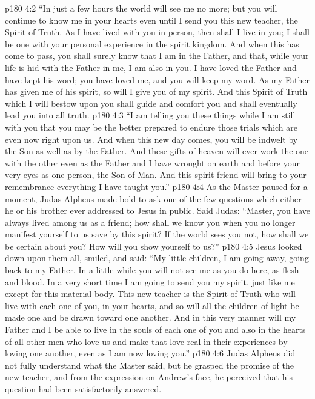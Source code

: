 \vs p180 4:2 \textcolor{ubdarkred}{“In just a few hours the world will see me no more; but you will continue to know me in your hearts even until I send you this new teacher, the Spirit of Truth. As I have lived with you in person, then shall I live in you; I shall be one with your personal experience in the spirit kingdom. And when this has come to pass, you shall surely know that I am in the Father, and that, while your life is hid with the Father in me, I am also in you. I have loved the Father and have kept his word; you have loved me, and you will keep my word. As my Father has given me of his spirit, so will I give you of my spirit. And this Spirit of Truth which I will bestow upon you shall guide and comfort you and shall eventually lead you into all truth.}
\vs p180 4:3 \textcolor{ubdarkred}{“I am telling you these things while I am still with you that you may be the better prepared to endure those trials which are even now right upon us. And when this new day comes, you will be indwelt by the Son as well as by the Father. And these gifts of heaven will ever work the one with the other even as the Father and I have wrought on earth and before your very eyes as one person, the Son of Man. And this spirit friend will bring to your remembrance everything I have taught you.”}
\vs p180 4:4 As the Master paused for a moment, Judas Alpheus made bold to ask one of the few questions which either he or his brother ever addressed to Jesus in public. Said Judas: “Master, you have always lived among us as a friend; how shall we know you when you no longer manifest yourself to us save by this spirit? If the world sees you not, how shall we be certain about you? How will you show yourself to us?”
\vs p180 4:5 Jesus looked down upon them all, smiled, and said: \textcolor{ubdarkred}{“My little children, I am going away, going back to my Father. In a little while you will not see me as you do here, as flesh and blood. In a very short time I am going to send you my spirit, just like me except for this material body. This new teacher is the Spirit of Truth who will live with each one of you, in your hearts, and so will all the children of light be made one and be drawn toward one another. And in this very manner will my Father and I be able to live in the souls of each one of you and also in the hearts of all other men who love us and make that love real in their experiences by loving one another, even as I am now loving you.”}
\vs p180 4:6 Judas Alpheus did not fully understand what the Master said, but he grasped the promise of the new teacher, and from the expression on Andrew’s face, he perceived that his question had been satisfactorily answered.
